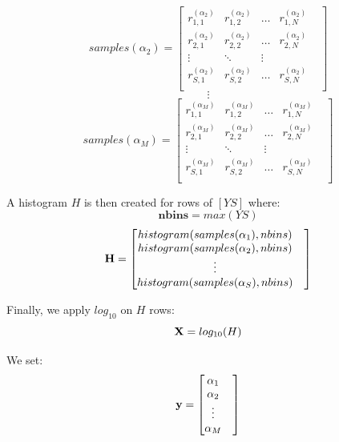 \documentclass[a4paper, 12pt]{report}
\begin{document}
\[
samples(\alpha_2) = \begin{bmatrix} 
    r^{(\alpha_2)}_{1,1} & r^{(\alpha_2)}_{1,2} & \dots & r^{(\alpha_2)}_{1,N} & \\
    r^{(\alpha_2)}_{2,1} & r^{(\alpha_2)}_{2,2} & \dots & r^{(\alpha_2)}_{2,N} & \\
    \vdots & \ddots & \vdots & \\
    r^{(\alpha_2)}_{S,1} & r^{(\alpha_2)}_{S,2} & \dots & r^{(\alpha_2)}_{S,N} & \\
\end{bmatrix}
\]
\[
\vdots
\]
\[
samples(\alpha_M) = \begin{bmatrix} 
    r^{(\alpha_M)}_{1,1} & r^{(\alpha_M)}_{1,2} & \dots & r^{(\alpha_M)}_{1,N} & \\
    r^{(\alpha_M)}_{2,1} & r^{(\alpha_M)}_{2,2} & \dots & r^{(\alpha_M)}_{2,N} & \\
    \vdots & \ddots & \vdots & \\
    r^{(\alpha_M)}_{S,1} & r^{(\alpha_M)}_{S,2} & \dots & r^{(\alpha_M)}_{S,N} & \\
\end{bmatrix}
\]

\par A histogram $H$ is then created for rows of $[YS]$ where: 
\begin{equation}
\label{eq:nbins}
\textbf {nbins} = max(YS)
\end{equation}
\[
{\textbf H} = \begin{bmatrix} 
    histogram(samples(\alpha_1), nbins) & \\
    histogram(samples(\alpha_2), nbins) & \\
    \vdots & \\
    histogram(samples(\alpha_S), nbins) & \\
\end{bmatrix}
\]

\par Finally, we apply $log_{10}$ on $H$ rows:
\begin{equation}
\label{eq:log_H}
    {\textbf X} = log_{10}(H)
\end{equation}

We set:
\begin{equation}
\label{eq:y}
{\textbf y} = \begin{bmatrix} 
    \alpha_1 & \\
    \alpha_2 & \\
    \vdots & \\
    \alpha_M & \\
\end{bmatrix}
\end{equation}
\end{document}
